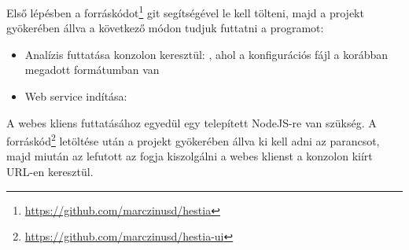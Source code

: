 Első lépésben a forráskódot\footnote{\url{https://github.com/marczinusd/hestia}} git segítségével le kell tölteni, majd a projekt gyökerében állva a következő módon tudjuk futtatni a programot:

\begin{itemize}
    \item Analízis futtatása konzolon keresztül: , ahol a konfigurációs fájl a korábban megadott formátumban van
    \item Web service indítása: 
\end{itemize}

A webes kliens futtatásához egyedül egy telepített NodeJS-re van szükség. A forráskód\footnote{\url{https://github.com/marczinusd/hestia-ui}} letöltése után a projekt gyökerében állva ki kell adni az  parancsot, majd miután az lefutott az  fogja kiszolgálni a webes klienst a konzolon kiírt URL-en keresztül.
